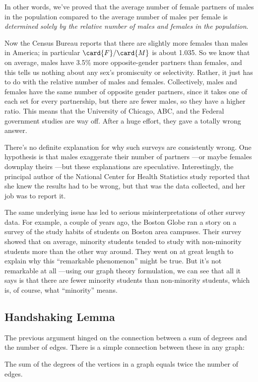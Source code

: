 In other words, we've proved that the average number of female
partners of males in the population compared to the average number of
males per female is \emph{determined solely by the relative number of
  males and females in the population}.

Now the Census Bureau reports that there are slightly more females
than males in America; in particular $\card{F} / \card{M}$ is about
1.035.  So we know that on average, males have 3.5\% more
opposite-gender partners than females, and this tells us nothing about
any sex's promiscuity or selectivity.  Rather, it just has to do with
the relative number of males and females.  Collectively, males and
females have the same number of opposite gender partners, since it
takes one of each set for every partnership, but there are fewer
males, so they have a higher ratio.  This means that the University of
Chicago, ABC, and the Federal government studies are way off.  After a
huge effort, they gave a totally wrong answer.

There's no definite explanation for why such surveys are consistently
wrong.  One hypothesis is that males exaggerate their number of
partners ---or maybe females downplay theirs ---but these explanations
are speculative.  Interestingly, the principal author of the National
Center for Health Statistics study reported that she knew the results
had to be wrong, but that was the data collected, and her job was to
report it.

The same underlying issue has led to serious misinterpretations of
other survey data.  For example, a couple of years ago, the Boston
Globe ran a story on a survey of the study habits of students on
Boston area campuses.  Their survey showed that on average, minority
students tended to study with non-minority students more than the
other way around.  They went on at great length to explain why this
``remarkable phenomenon'' might be true.  But it's not remarkable at
all ---using our graph theory formulation, we can see that all it says
is that there are fewer minority students than non-minority students,
which is, of course, what ``minority'' means.

\subsection{Handshaking Lemma}
The previous argument hinged on the connection between a sum of
degrees and the number of edges.  There is a simple connection between
these in any graph:

\begin{lemma}\label{sumedges}
The sum of the degrees of the vertices in a graph equals twice the number of edges.
\end{lemma}

